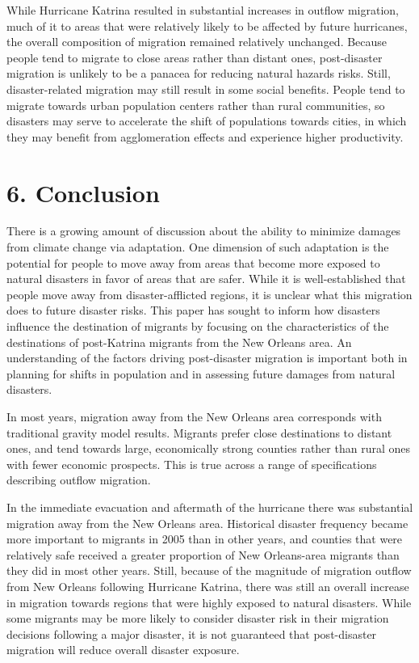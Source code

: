 \documentclass[]{article}
\begin{document}
While Hurricane Katrina resulted in substantial increases in outflow
migration, much of it to areas that were relatively likely to be
affected by future hurricanes, the overall composition of migration
remained relatively unchanged. Because people tend to migrate to close
areas rather than distant ones, post-disaster migration is unlikely to
be a panacea for reducing natural hazards risks. Still, disaster-related
migration may still result in some social benefits. People tend to
migrate towards urban population centers rather than rural communities,
so disasters may serve to accelerate the shift of populations towards
cities, in which they may benefit from agglomeration effects and
experience higher productivity.

\section{\texorpdfstring{6. Conclusion
\label{sec:conclusion}}{6. Conclusion }}\label{conclusion}

There is a growing amount of discussion about the ability to minimize
damages from climate change via adaptation. One dimension of such
adaptation is the potential for people to move away from areas that
become more exposed to natural disasters in favor of areas that are
safer. While it is well-established that people move away from
disaster-afflicted regions, it is unclear what this migration does to
future disaster risks. This paper has sought to inform how disasters
influence the destination of migrants by focusing on the characteristics
of the destinations of post-Katrina migrants from the New Orleans area.
An understanding of the factors driving post-disaster migration is
important both in planning for shifts in population and in assessing
future damages from natural disasters.

In most years, migration away from the New Orleans area corresponds with
traditional gravity model results. Migrants prefer close destinations to
distant ones, and tend towards large, economically strong counties
rather than rural ones with fewer economic prospects. This is true
across a range of specifications describing outflow migration.

In the immediate evacuation and aftermath of the hurricane there was
substantial migration away from the New Orleans area. Historical
disaster frequency became more important to migrants in 2005 than in
other years, and counties that were relatively safe received a greater
proportion of New Orleans-area migrants than they did in most other
years. Still, because of the magnitude of migration outflow from New
Orleans following Hurricane Katrina, there was still an overall increase
in migration towards regions that were highly exposed to natural
disasters. While some migrants may be more likely to consider disaster
risk in their migration decisions following a major disaster, it is not
guaranteed that post-disaster migration will reduce overall disaster
exposure.
\end{document}
